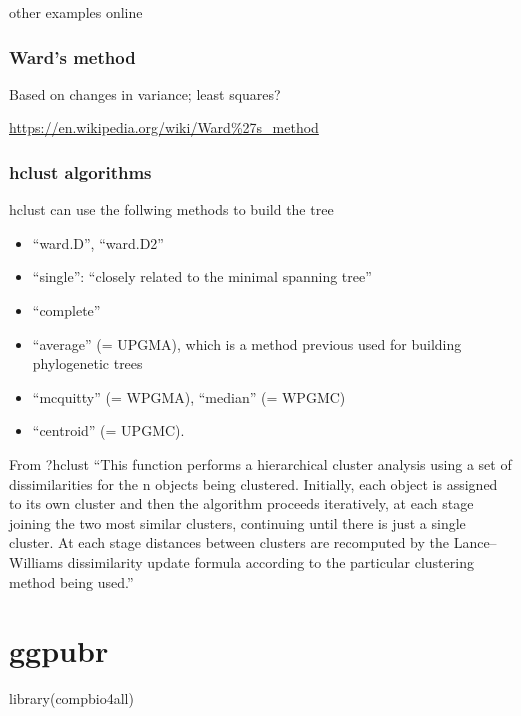 \documentclass[
]{book}
\newenvironment{Shaded}{\begin{snugshade}}{\end{snugshade}}
\newcommand{\FunctionTok}[1]{\textcolor[rgb]{0.00,0.00,0.00}{#1}}
\newcommand{\NormalTok}[1]{#1}
\providecommand{\tightlist}{%
  \setlength{\itemsep}{0pt}\setlength{\parskip}{0pt}}
\begin{document}
other examples online

\hypertarget{wards-method}{%
\subsection{Ward's method}\label{wards-method}}

Based on changes in variance; least squares?

\url{https://en.wikipedia.org/wiki/Ward\%27s_method}

\hypertarget{hclust-algorithms}{%
\subsection{hclust algorithms}\label{hclust-algorithms}}

hclust can use the follwing methods to build the tree

\begin{itemize}
\tightlist
\item
  ``ward.D'', ``ward.D2''
\item
  ``single'': ``closely related to the minimal spanning tree''
\item
  ``complete''
\item
  ``average'' (= UPGMA), which is a method previous used for building phylogenetic trees
\item
  ``mcquitty'' (= WPGMA), ``median'' (= WPGMC)
\item
  ``centroid'' (= UPGMC).
\end{itemize}

From ?hclust ``This function performs a hierarchical cluster analysis using a set of dissimilarities for the n objects being clustered. Initially, each object is assigned to its own cluster and then the algorithm proceeds iteratively, at each stage joining the two most similar clusters, continuing until there is just a single cluster. At each stage distances between clusters are recomputed by the Lance--Williams dissimilarity update formula according to the particular clustering method being used.''

\hypertarget{ggpubr}{%
\chapter{ggpubr}\label{ggpubr}}

\begin{Shaded}
\begin{Highlighting}[]
\FunctionTok{library}\NormalTok{(compbio4all)}
\end{Highlighting}
\end{Shaded}
\end{document}
